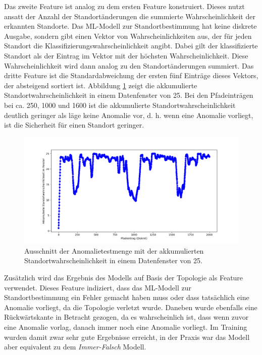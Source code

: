 \newline
\newline
Das zweite Feature ist analog zu dem ersten Feature konstruiert.
Dieses nutzt ansatt der Anzahl der Standortänderungen die summierte Wahrscheinlichkeit der erkannten Standorte.
Das ML-Modell zur Standortbestimmung hat keine diskrete Ausgabe, sondern gibt einen Vektor von Wahrscheinlichkeiten aus,
der für jeden Standort die Klassifizierungswahrscheinlichkeit angibt.
Dabei gilt der klassifizierte Standort als der Eintrag im Vektor mit der höchsten Wahrscheinlichkeit.
Diese Wahrscheinlichkeit wird dann analog zu den Standortänderungen summiert.
Das dritte Feature ist die Standardabweichung der ersten fünf Einträge dieses Vektors, der absteigend sortiert ist.
Abbildung \ref{fig:window_confidence} zeigt die akkumulierte Standortwahrscheinlichkeit in einem Datenfenster von 25.
Bei den Pfadeinträgen bei ca. 250, 1000 und 1600 ist die akkumulierte Standortwahrscheinlichkeit deutlich geringer als läge keine Anomalie vor,
d. h. wenn eine Anomalie vorliegt, ist die Sicherheit für einen Standort geringer.
\begin{figure}[h!]
    \centering
    \includegraphics[width=\linewidth]{images/feature_window_confidence.png}
    \caption{Ausschnitt der Anomalietestmenge mit der akkumulierten Standortwahrscheinlichkeit in einem Datenfenster von 25.}
    \label{fig:window_confidence}
\end{figure}
\newline
\newline
Zusätzlich wird das Ergebnis des Modells auf Basis der Topologie als Feature verwendet.
Dieses Feature indiziert, dass das ML-Modell zur Standortbestimmung ein Fehler gemacht haben muss
oder dass tatsächlich eine Anomalie vorliegt, da die Topologie verletzt wurde.
\newline
\newline
Daneben wurde ebenfalls eine Rückwärtskante in Betracht gezogen,
da es wahrscheinlich ist, dass wenn zuvor eine Anomalie vorlag, danach immer noch eine Anomalie vorliegt.
Im Training wurden damit zwar sehr gute Ergebnisse erreicht,
in der Praxis war das Modell aber equivalent zu dem \textit{Immer-Falsch} Modell.
